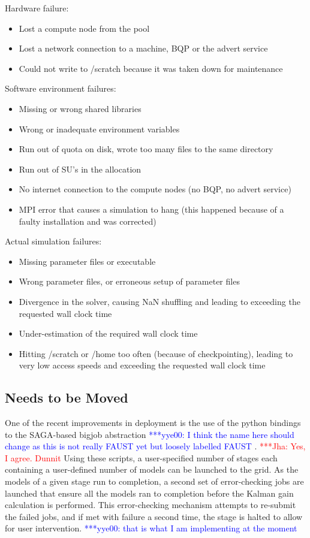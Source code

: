 \documentclass[conference,final]{IEEEtran}
\newcommand{\jhanote}[1]{ {\textcolor{red} { ***Jha: #1 }}}
\newcommand{\yyenote}[1]{ {\textcolor{blue} { ***yye00: #1 }}}
\begin{document}
Hardware failure:
\begin{itemize}
\item{Lost a compute node from the pool}
\item{Lost a network connection to a machine, BQP or the advert service}
\item{Could not write to /scratch because it was taken down for maintenance}
\end{itemize}

Software environment failures:
\begin{itemize}
\item{Missing or wrong shared libraries}
\item{Wrong or inadequate environment variables}
\item{Run out of quota on disk, wrote too many files to the same directory}
\item{Run out of SU's in the allocation}
\item{No internet connection to the compute nodes (no BQP, no advert service)}
\item{MPI error that causes a simulation to hang (this happened because of a faulty installation and was corrected)}
\end{itemize}

Actual simulation failures:
\begin{itemize}
\item{Missing parameter files or executable}
\item{Wrong parameter files, or erroneous setup of parameter files}
\item{Divergence in the solver, causing NaN shuffling and leading to exceeding the requested wall clock time}
\item{Under-estimation of the required wall clock time}
\item{Hitting /scratch or /home too often (because of checkpointing), leading to very low access speeds and exceeding the requested wall clock time}
\end{itemize}

\subsection{Needs to be Moved}
One of the recent improvements in deployment is the use of the python
bindings to the SAGA-based bigjob abstraction \yyenote{I think the
  name here should change as this is not really FAUST yet but loosely
  labelled FAUST}. \jhanote{Yes, I agree. Dunnit} Using these scripts,
a user-specified number of stages each containing a user-defined
number of models can be launched to the grid. As the models of a given
stage run to completion, a second set of error-checking jobs are
launched that ensure all the models ran to completion before the
Kalman gain calculation is performed. This error-checking mechanism
attempts to re-submit the failed jobs, and if met with failure a
second time, the stage is halted to allow for user
intervention. \yyenote{that is what I am implementing at the moment}
\end{document}
